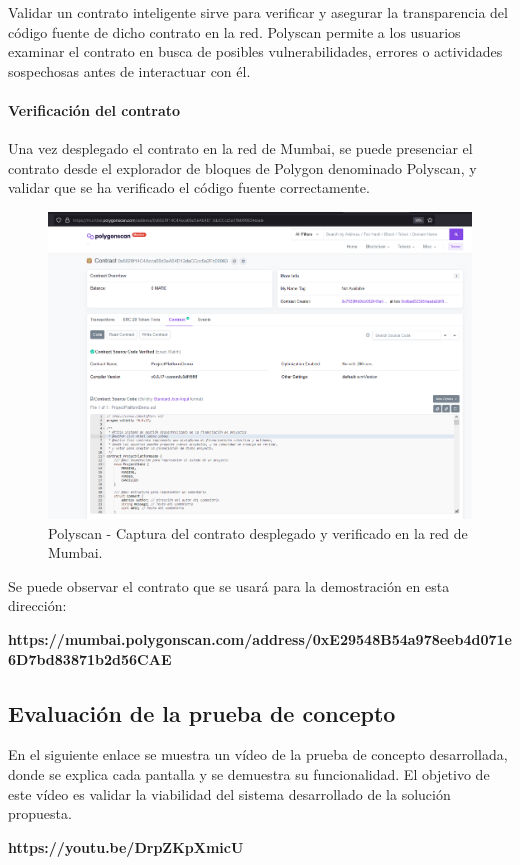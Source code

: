 \bigskip

Validar un contrato inteligente sirve para verificar y asegurar la transparencia del código fuente de dicho contrato en la red. Polyscan permite a los usuarios examinar el contrato en busca de posibles vulnerabilidades, errores o actividades sospechosas antes de interactuar con él.

\newpage

\paragraph{Verificación del contrato}

Una vez desplegado el contrato en la red de Mumbai, se puede presenciar el contrato desde el explorador de bloques de Polygon denominado Polyscan, y validar que se ha verificado el código fuente correctamente.

\begin{figure}[H]
        \centering
        \includegraphics[width=1\textwidth]{img/capturas/etherscan.png}
        \caption{Polyscan - Captura del contrato desplegado y verificado en la red de Mumbai.}
        \label{fig:configApi}
\end{figure}

Se puede observar el contrato que se usará para la demostración en esta dirección:

\bigskip
\begin{center}
    \textbf{https://mumbai.polygonscan.com/address/0xE29548B54a978eeb4d071e6D7bd83871b2d56CAE}
\end{center}

\newpage

\subsection{Evaluación de la prueba de concepto}

En el siguiente enlace se muestra un vídeo de la prueba de concepto desarrollada, donde se explica cada pantalla y se demuestra su funcionalidad. El objetivo de este vídeo es validar la viabilidad del sistema desarrollado de la solución propuesta.

\bigskip

\begin{center}
    \textbf{https://youtu.be/DrpZKpXmicU}
\end{center}